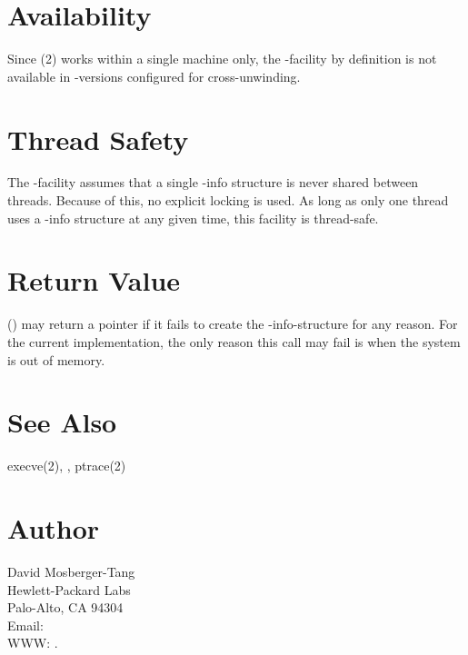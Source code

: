 \documentclass{article}
\begin{document}
\section{Availability}

Since (2) works within a single machine only, the
-facility by definition is not available in
-versions configured for cross-unwinding.

\section{Thread Safety}

The -facility assumes that a single -info
structure is never shared between threads.  Because of this, no
explicit locking is used.  As long as only one thread uses
a -info structure at any given time, this facility
is thread-safe.

\section{Return Value}

() may return a  pointer if it fails
to create the -info-structure for any reason.  For the
current implementation, the only reason this call may fail is when the
system is out of memory.

\section{See Also}

execve(2),
,
ptrace(2)

\section{Author}

\noindent
David Mosberger-Tang\\
Hewlett-Packard Labs\\
Palo-Alto, CA 94304\\
Email: \\
WWW: .
\LatexManEnd
\end{document}
